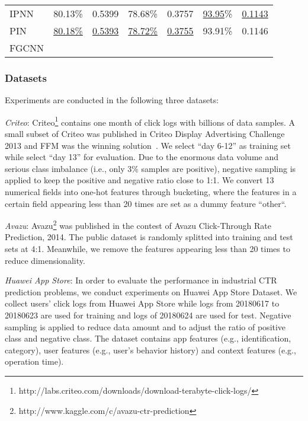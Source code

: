 \begin{table*}[t]
{\begin{tabular}{lll|ll|ll}
\multicolumn{1}{l|}{IPNN}    & 80.13\%             & \multicolumn{1}{l|}{0.5399}             & 78.68\%                  & \multicolumn{1}{l|}{0.3757}                 & \underline{93.95}\%                  & \underline{0.1143}                  \\
\multicolumn{1}{l|}{PIN}     & \underline{80.18\%}\footnotemark[11] & \multicolumn{1}{l|}{\underline{0.5393}} & \underline{78.72\%}      & \multicolumn{1}{l|}{\underline{0.3755}}     & 93.91\%      & 0.1146      \\ \hline
\multicolumn{1}{l|}{FGCNN}   &      & \multicolumn{1}{l|}{}    &  & \multicolumn{1}{l|}{} &  & \\ \hline\hline
\end{tabular}
}
\vspace{-3ex}
\end{table*}


\subsubsection{Datasets} Experiments are conducted in the following three datasets:

\textit{Criteo}: Criteo\footnote{http://labs.criteo.com/downloads/download-terabyte-click-logs/} contains one month of click logs with billions of data samples. A small subset of Criteo was published in Criteo Display Advertising Challenge 2013 and FFM was the winning solution~\cite{pin, ffm}. We select ``day 6-12'' as training set while select ``day 13'' for evaluation. Due to the enormous data volume and serious class imbalance (i.e., only 3\% samples are positive), negative sampling is applied to keep the positive and negative ratio close to 1:1. We convert 13 numerical fields into one-hot features through bucketing, where the features in a certain field appearing less than 20 times are set as a dummy feature ``other``.

\textit{Avazu}: Avazu\footnote{http://www.kaggle.com/c/avazu-ctr-prediction} was published in the contest of Avazu Click-Through Rate Prediction, 2014. The public dataset is randomly splitted into training and test sets at 4:1. Meanwhile, we remove the features appearing less than 20 times to reduce dimensionality.

\textit{Huawei App Store}: In order to evaluate the performance in industrial CTR prediction problems, we conduct experiments on Huawei App Store Dataset. We collect users' click logs from Huawei App Store while logs from 20180617 to 20180623 are used for training and logs of 20180624 are used for test. Negative sampling is applied to reduce data amount and to adjust the ratio of positive class and negative class. The dataset contains app features (e.g., identification, category), user features (e.g., user's behavior history) and context features (e.g., operation time).




